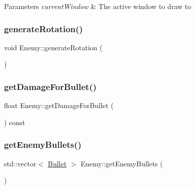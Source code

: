 \begin{DoxyParams}{Parameters}
{\em current\+Window} & The active window to draw to \\
\hline
\end{DoxyParams}
\mbox{\label{class_enemy_a66c71c54afd65734ed82983882a940e6}} 
\subsubsection{\texorpdfstring{generate\+Rotation()}{generateRotation()}}
{\footnotesize\ttfamily void Enemy\+::generate\+Rotation (\begin{DoxyParamCaption}{ }\end{DoxyParamCaption})\hspace{0.3cm}{\ttfamily [private]}}

\mbox{\label{class_enemy_a73e88b0f1e68650e6ea536c53a3cf920}} 
\subsubsection{\texorpdfstring{get\+Damage\+For\+Bullet()}{getDamageForBullet()}}
{\footnotesize\ttfamily float Enemy\+::get\+Damage\+For\+Bullet (\begin{DoxyParamCaption}{ }\end{DoxyParamCaption}) const\hspace{0.3cm}{\ttfamily [inline]}}

\mbox{\label{class_enemy_a849b23a3f78625911b0969506426d4da}} 
\subsubsection{\texorpdfstring{get\+Enemy\+Bullets()}{getEnemyBullets()}}
{\footnotesize\ttfamily std\+::vector$<$ \hyperlink{class_bullet}{Bullet} $>$ Enemy\+::get\+Enemy\+Bullets (\begin{DoxyParamCaption}{ }\end{DoxyParamCaption})}



